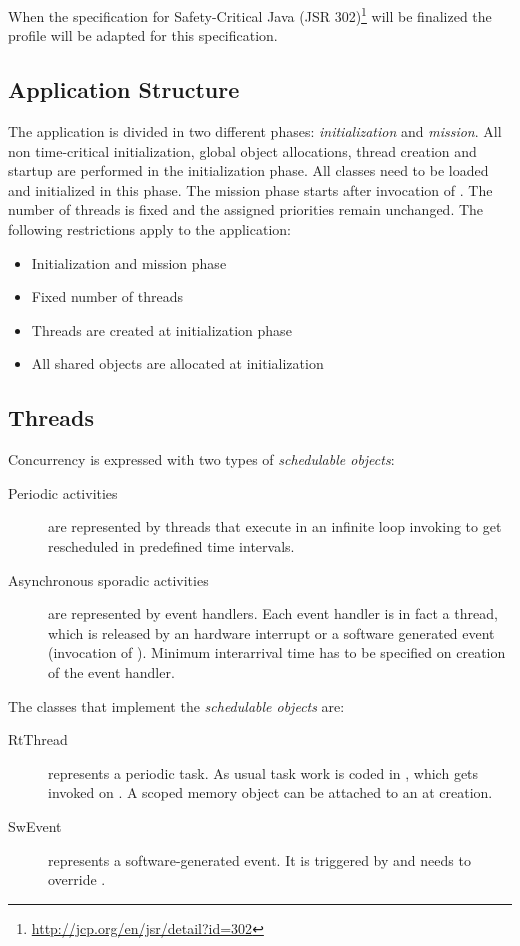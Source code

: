 When the specification for Safety-Critical Java (JSR
302)\footnote{\url{http://jcp.org/en/jsr/detail?id=302}}
\cite{scj:as:proceedings} will be finalized the profile will be
adapted for this specification.

\subsection{Application Structure}

The application is divided in two different phases:
\emph{initialization} and \emph{mission}. All non time-critical
initialization, global object allocations, thread creation and
startup are performed in the initialization phase. All classes need
to be loaded and initialized in this phase. The mission phase starts
after invocation of . The number of threads is
fixed and the assigned priorities remain unchanged. The following
restrictions apply to the application:

\begin{itemize}
\item Initialization and mission phase
\item Fixed number of threads
\item Threads are created at initialization phase
\item All shared objects are allocated at initialization
\end{itemize}

\subsection{Threads}

Concurrency is expressed with two types of \emph{schedulable
objects}:
\begin{description}
    \item[Periodic activities] are represented by threads that execute
in an infinite loop invoking  to get
rescheduled in predefined time intervals.

    \item[Asynchronous sporadic activities] are represented by event
handlers. Each event handler is in fact a thread, which is released
by an hardware interrupt or a software generated event (invocation
of ). Minimum interarrival time has to be specified on
creation of the event handler.

\end{description}
%
The classes that implement the \emph{schedulable objects} are:
%
\begin{description}
    \item[RtThread] represents a periodic task. As usual task
work is coded in , which gets invoked on
. A scoped memory object can be attached to an
 at creation.

    \item[SwEvent] represents a software-generated event. It is
        triggered by  and needs to override
        .

\end{description}
%


